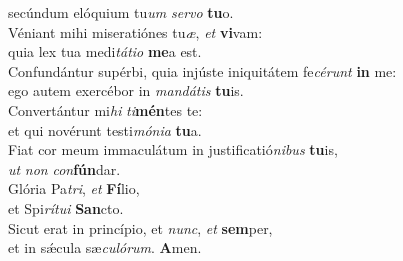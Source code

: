\evenverse secúndum elóquium tu\textit{um} \textit{ser}\textit{vo} \textbf{tu}o.\\
\oddverse Véniant mihi miseratiónes tu\textit{æ}, \textit{et} \textbf{vi}vam:~\*\\
\oddverse quia lex tua medi\textit{tá}\textit{ti}\textit{o} \textbf{me}a est.\\
\evenverse Confundántur supérbi, quia injúste iniquitátem fe\textit{cé}\textit{runt} \textbf{in} me:~\*\\
\evenverse ego autem exercébor in \textit{man}\textit{dá}\textit{tis} \textbf{tu}is.\\
\oddverse Convertántur mi\textit{hi} \textit{ti}\textbf{mén}tes te:~\*\\
\oddverse et qui novérunt testi\textit{mó}\textit{ni}\textit{a} \textbf{tu}a.\\
\evenverse Fiat cor meum immaculátum in justificatió\textit{ni}\textit{bus} \textbf{tu}is,~\*\\
\evenverse \textit{ut} \textit{non} \textit{con}\textbf{fún}dar.\\
\oddverse Glória Pa\textit{tri}, \textit{et} \textbf{Fí}lio,~\*\\
\oddverse et Spi\textit{rí}\textit{tu}\textit{i} \textbf{San}cto.\\
\evenverse Sicut erat in princípio, et \textit{nunc}, \textit{et} \textbf{sem}per,~\*\\
\evenverse et in sǽcula sæ\textit{cu}\textit{ló}\textit{rum}. \textbf{A}men.\\
